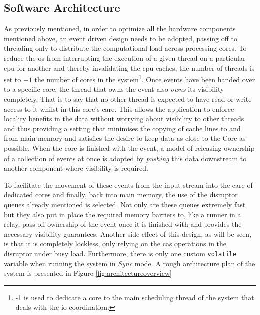 \documentclass[a4paper,11pt]{scrreprt}
\begin{document}
\subsection{Software Architecture}
As previously mentioned, in order to optimize all the hardware components mentioned above, an event driven design needs to be adopted, passing off to threading only to distribute the computational load across processing cores. To reduce the \acrshort{os} from interrupting the execution of a given thread on a particular \acrshort{cpu} for another and thereby invalidating the \acrshort{cpu} caches, the number of threads is set to \(-1\) the number of cores in the system\footnote{-1 is used to dedicate a core to the main scheduling thread of the system that deals with the \acrshort{io} coordination.}. Once events have been handed over to a specific core, the thread that owns the event also \textit{owns} its visibility completely. That is to say that no other thread is expected to have read or write access to it whilst in this core's care. This allows the application to enforce locality benefits in the data without worrying about visibility to other threads and thus providing a setting that minimises the copying of cache lines to and from main memory and satisfies the desire to keep data as close to the Core as possible. When the core is finished with the event, a model of releasing ownership of a collection of events at once is adopted by \textit{pushing} this data downstream to another component where visibility is required. 

To facilitate the movement of these events from the input stream into the care of dedicated cores and finally, back into main memory, the use of the disruptor queues already mentioned is selected. Not only are these queues extremely fast but they also put in place the required memory barriers to, like a runner in a relay, pass off ownership of the event once it is finished with and provides the necessary visibility guarantees. Another side effect of this design, as will be seen, is that it is completely lockless, only relying on the \acrshort{cas} operations in the disruptor under busy load. Furthermore, there is only one custom \texttt{volatile} variable when running the system in \textit{Sync} mode. A rough architecture plan of the system is presented in Figure \ref{fig:architectureoverview}
\end{document}
